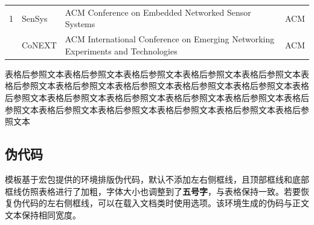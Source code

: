 \documentclass[QingNianC, vlined, timesmathnogreek]{nsfc}
\begin{document}
\begin{longtable}{m{2em}<{\centering} p{4.5em} p{15em} p{6em}}
		1 & SenSys & ACM Conference on Embedded Networked Sensor Systems & ACM \\
		\pagebreak  %
		2 & CoNEXT & ACM International Conference on Emerging Networking Experiments and Technologies & ACM \\
		
		
		
	\end{longtable}

	表格后参照文本表格后参照文本表格后参照文本表格后参照文本表格后参照文本表格后参照文本表格后参照文本表格后参照文本表格后参照文本表格后参照文本表格后参照文本表格后参照文本表格后参照文本表格后参照文本表格后参照文本表格后参照文本表格后参照文本表格后参照文本表格后参照文本表格后参照文本表格后参照文本
	
	\clearpage
	\subsection{伪代码}
	
	模板基于\href{https://mirrors.sustech.edu.cn/CTAN/macros/latex/contrib/algorithm2e/doc/algorithm2e.pdf}{\ttfamily\color{DarkRed}}宏包提供的环境排版伪代码，默认不添加左右侧框线，且顶部框线和底部框线仿照表格进行了加粗，字体大小也调整到了\textbf{五号字}，与表格保持一致。若要恢复伪代码的左右侧框线，可以在载入文档类时使用选项。该环境生成的伪码与正文文本保持相同宽度。
	
\end{document}
